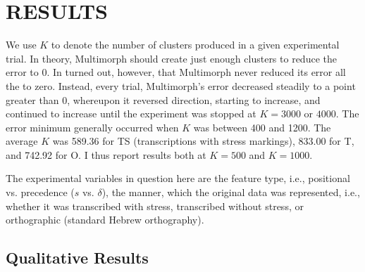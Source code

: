 \chapter{RESULTS}
\label{ch:results}
We use $K$ to denote the number of clusters produced in a given experimental
trial. In theory, Multimorph should create just enough clusters to reduce the error
to 0. In turned out, however, that Multimorph never reduced its error all the to zero. Instead,
every trial, Multimorph's error decreased steadily to a point greater than 0, whereupon it reversed direction, starting to 
increase, and continued to increase until the experiment was stopped at $K = 3000$ or $4000$.  The error minimum generally occurred when $K$ was between 400 and 1200. 
The average $K$ was 589.36 for TS (transcriptions with stress markings), 833.00 for T, and 742.92 for O. I thus 
report results both at $K = 500$ and $K = 1000$.

The experimental variables in question here are the feature type, i.e.,  positional vs. precedence ($s$ vs. $\delta$),
the manner, which the original data was represented, i.e., whether it was transcribed with stress, transcribed without stress,
or orthographic (standard Hebrew orthography).

\section{Qualitative Results}

%

